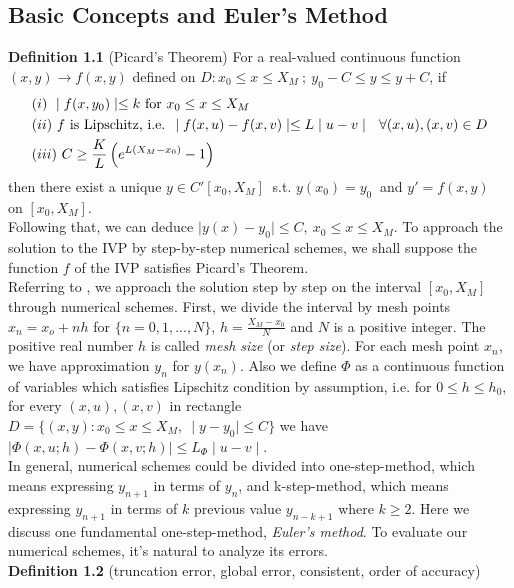\documentclass[
11pt, %
a4paper, %
oneside, %
headinclude,footinclude, %
BCOR5mm, %
]{scrartcl}
\begin{document}
\subsection{Basic Concepts and Euler's Method}
\textbf{Definition 1.1} (Picard's Theorem) For a real-valued continuous function $(x,y)\rightarrow f(x,y)$ defined on $D: x_0\leq x\leq X_M \ ; \ y_0-C\leq y\leq y+C$, if 
\begin{align}
    &(i) \ \mid f(x,y_0)\mid \leq k \text{ for } x_0\leq x\leq X_M \notag \\
    &(ii) \ f \text{ is Lipschitz, i.e. }\mid f(x,u)-f(x,v)\mid \leq L\mid u-v\mid \ \ \forall (x,u), (x,v)\in D \notag \\
    &(iii) \ C\geq \frac{K}{L}\left(e^{L(X_M-x_0)}-1\right) \notag
\end{align}
 then there exist a unique $y\in C'[x_0,X_M]\ $ s.t. $y(x_0)=y_0\ $ and $y'=f(x,y)\ $ on $[x_0,X_M]$. 
 \vspace{0.6em}\\Following that, we can deduce $\mid y(x)-y_0\mid \leq C,\ x_0\leq x\leq X_M$. To approach the solution to the IVP by step-by-step numerical schemes, we shall suppose the function $f$ of the IVP satisfies Picard's Theorem. 
\vspace{0.6em}\\Referring to \cite{suli2003introduction}, we approach the solution step by step on the interval $[x_0,X_M]$ through numerical schemes. First, we divide the interval by mesh points $x_n = x_o+nh$ for $\{n=0,1,...,N\}$, $h=\frac{X_M-x_0}{N}$ and $N$ is a positive integer. The positive real number $h$ is called \textit{mesh size} (or \textit{step size}). For each mesh point $x_n$, we have approximation $y_n$ for $y(x_n)$. Also we define $\Phi$ as a continuous function of variables which satisfies Lipschitz condition by assumption, i.e. for $0\leq h\leq h_0$, for every $(x,u),(x,v)$ in rectangle $D=\{(x,y): x_0\leq x\leq X_M, \ \mid y-y_0\mid \leq C\}$ we have $\mid \Phi(x,u;h)-\Phi(x,v;h)\mid \leq L_{\Phi}\mid u-v\mid $. 
\vspace{0.6em}\\In general, numerical schemes could be divided into one-step-method, which means expressing $y_{n+1}$ in terms of $y_n$, and k-step-method, which means expressing $y_{n+1}$ in terms of $k$ previous value $y_{n-k+1}$ where $k\geq 2$. Here we discuss one fundamental one-step-method, \textit{Euler's method}. To evaluate our numerical schemes, it's natural to analyze its errors. 
\vspace{0.6em}\\ \textbf{Definition 1.2} (truncation error, global error, consistent, order of accuracy)
\end{document}
